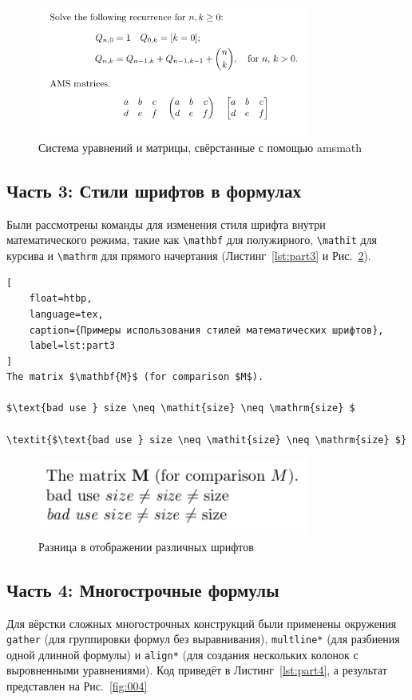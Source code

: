 \documentclass[a4paper, 12pt]{article}
\renewcommand{\figurename}{Рис.}
\renewcommand{\lstlistingname}{Листинг}
\begin{document}
\begin{figure}[H]
    \centering
    \includegraphics[width=0.8\textwidth]{image/2.png}
    \caption{Система уравнений и матрицы, свёрстанные с помощью amsmath}
    \label{fig:002}
\end{figure}

\subsection{Часть 3: Стили шрифтов в формулах}
Были рассмотрены команды для изменения стиля шрифта внутри математического режима, такие как \texttt{\textbackslash mathbf} для полужирного, \texttt{\textbackslash mathit} для курсива и \texttt{\textbackslash mathrm} для прямого начертания (\lstlistingname~\ref{lst:part3} и \figurename~\ref{fig:003}).

\begin{lstlisting}[
    float=htbp, 
    language=tex,
    caption={Примеры использования стилей математических шрифтов}, 
    label=lst:part3
]
The matrix $\mathbf{M}$ (for comparison $M$).

$\text{bad use } size \neq \mathit{size} \neq \mathrm{size} $

\textit{$\text{bad use } size \neq \mathit{size} \neq \mathrm{size} $}
\end{lstlisting}

\begin{figure}[H]
    \centering
    \includegraphics[width=0.8\textwidth]{image/3.png}
    \caption{Разница в отображении различных шрифтов}
    \label{fig:003}
\end{figure}

\subsection{Часть 4: Многострочные формулы}
Для вёрстки сложных многострочных конструкций были применены окружения \texttt{gather} (для группировки формул без выравнивания), \texttt{multline*} (для разбиения одной длинной формулы) и \texttt{align*} (для создания нескольких колонок с выровненными уравнениями). Код приведёт в \lstlistingname~\ref{lst:part4}, а результат представлен на \figurename~\ref{fig:004}
\end{document}
